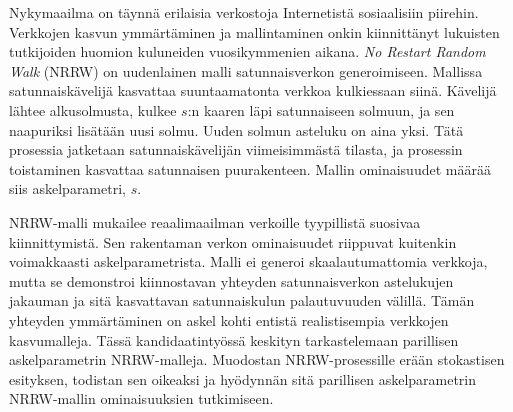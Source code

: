 \documentclass[finnish, 12pt, a4paper, sci, utf8, pdfa]{aaltothesis}
\date{1.5.2018}
\begin{document}
	
\makecoverpage

\makecopyrightpage

\begin{abstractpage}[finnish]
Nykymaailma on täynnä erilaisia verkostoja Internetistä sosiaalisiin piirehin. Verkkojen kasvun ymmärtäminen ja mallintaminen
onkin kiinnittänyt lukuisten tutkijoiden huomion kuluneiden vuosikymmenien aikana.
\textit{No Restart Random Walk} (NRRW) on uudenlainen malli satunnaisverkon generoimiseen. Mallissa satunnaiskävelijä kasvattaa suuntaamatonta verkkoa 
kulkiessaan siinä. Kävelijä lähtee alkusolmusta, kulkee $ s $:n kaaren läpi satunnaiseen solmuun, ja sen naapuriksi lisätään 
uusi solmu. Uuden solmun asteluku on aina yksi. Tätä prosessia jatketaan satunnaiskävelijän viimeisimmästä tilasta, ja prosessin 
toistaminen kasvattaa satunnaisen puurakenteen. Mallin ominaisuudet määrää siis askelparametri, $ s $. 

NRRW-malli mukailee reaalimaailman verkoille tyypillistä suosivaa kiinnittymistä. Sen rakentaman verkon ominaisuudet riippuvat 
kuitenkin voimakkaasti askelparametrista. Malli ei generoi skaalautumattomia verkkoja, mutta se demonstroi kiinnostavan yhteyden 
satunnaisverkon astelukujen jakauman ja sitä kasvattavan satunnaiskulun palautuvuuden välillä. Tämän yhteyden ymmärtäminen on askel 
kohti entistä realistisempia verkkojen kasvumalleja. Tässä kandidaatintyössä keskityn tarkastelemaan parillisen askelparametrin 
NRRW-malleja. Muodostan NRRW-prosessille erään stokastisen esityksen, todistan sen oikeaksi ja hyödynnän sitä parillisen askelparametrin 
NRRW-mallin ominaisuuksien tutkimiseen.
\end{abstractpage}

\end{document}
